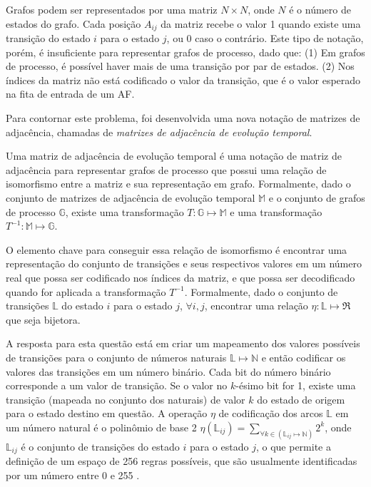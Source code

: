 \documentclass[a4,11pt]{article}
\begin{document}
Grafos podem ser representados por uma matriz $N \times N$, onde $N$
é o número de estados do grafo. Cada posição $A_{ij}$ da matriz recebe o valor
1 quando existe uma transição do estado $i$ para o estado $j$, ou 0 caso o
contrário. Este tipo de notação, porém, é insuficiente para representar grafos
de processo, dado que: (1) Em grafos de processo, é possível haver mais de
uma transição por par de estados. (2) Nos índices da matriz não está
codificado o valor da transição, que é o valor esperado na fita de
entrada de um AF.

Para contornar este problema, foi desenvolvida uma nova notação de matrizes de adjacência,
chamadas de \textit{matrizes de adjacência de evolução temporal}.

Uma matriz de adjacência de evolução temporal é uma notação de matriz de
adjacência para representar grafos de processo que possui uma relação
de isomorfismo entre a matriz e sua representação em grafo.
Formalmente, dado o conjunto de matrizes de adjacência
de evolução temporal $\mathbb{M}$ e o conjunto de grafos de processo $\mathbb{G}$,
existe uma transformação $T: \mathbb{G} \mapsto \mathbb{M}$ e uma
transformação $T^{-1}: \mathbb{M} \mapsto \mathbb{G}$. 

O elemento chave para conseguir essa relação de isomorfismo
é encontrar uma representação do conjunto de transições e
seus respectivos valores em um número real que possa ser codificado
nos índices da matriz, e que possa ser decodificado quando for
aplicada a transformação $T^{-1}$. Formalmente, dado o conjunto de transições
$\mathbb{L}$ do estado $i$ para o estado $j$, $\forall i,j$, encontrar uma
relação $\eta:\mathbb{L} \mapsto \Re$ que seja bijetora.

A resposta para esta questão está em criar um mapeamento dos valores
possíveis de transições para o conjunto de números naturais
$\mathbb{L} \mapsto \mathbb{N}$ e então codificar os valores das transições
em um número binário. Cada bit do número binário corresponde a um valor de
transição. Se o valor no $k$-ésimo bit for 1, existe uma
transição (mapeada no conjunto dos naturais) de valor $k$ do estado de
origem para o estado destino em questão. A operação $\eta$ de codificação dos
arcos $\mathbb{L}$ em um número natural é o polinômio de base 2
$\eta(\mathbb{L}_{ij}) = \sum_{\forall k \in (\mathbb{L}_{ij} \mapsto \mathbb{N})} 2^k$,
onde $\mathbb{L}_{ij}$ é o conjunto de transições do estado $i$ para o estado $j$,
o que permite a definição de um espaço de 256 regras possíveis, que são usualmente
identificadas por um número entre 0 e 255 \cite{wolfram1984}.
\end{document}
